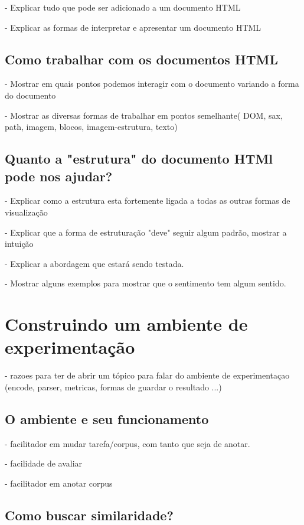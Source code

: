 \documentclass{acm_proc_article-sp}
\numberwithin{equation}{section}
\begin{document}
- Explicar tudo que pode ser adicionado a um documento HTML

- Explicar as formas de interpretar e apresentar um documento HTML

\subsection{Como trabalhar com os documentos HTML}

- Mostrar em quais pontos podemos interagir com o documento variando a forma do documento

- Mostrar as diversas formas de trabalhar em pontos semelhante( DOM, sax, path, imagem, blocos, imagem-estrutura, texto)


\subsection{Quanto a "estrutura" do documento HTMl pode nos ajudar?}

- Explicar como a estrutura esta fortemente ligada a todas as outras formas de visualização

- Explicar que a forma de estruturação "deve" seguir algum padrão, mostrar a intuição

- Explicar a abordagem que estará sendo testada.

- Mostrar alguns exemplos para mostrar que o sentimento tem algum sentido.

\section{Construindo um ambiente de experimentação}

- razoes para ter de abrir um tópico para falar do ambiente de experimentaçao (encode, parser, metricas, formas de guardar o resultado ...)

\subsection{O ambiente e seu funcionamento}

- facilitador em mudar tarefa/corpus, com tanto que seja de anotar.

- facilidade de avaliar

- facilitador em anotar corpus

\subsection{Como buscar similaridade?}
\end{document}
